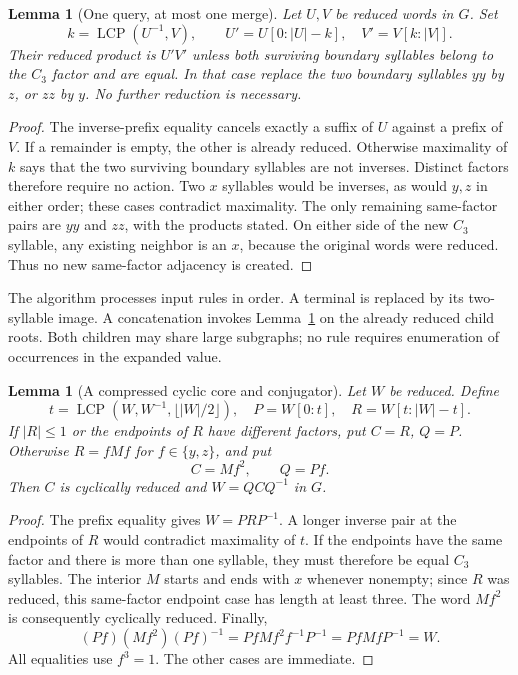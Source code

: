 \documentclass[11pt,letterpaper]{article}
\newtheorem{lemma}[theorem]{Lemma}
\theoremstyle{definition}\newtheorem{definition}[theorem]{Definition}
\theoremstyle{remark}\newtheorem{remark}[theorem]{Remark}
\newcommand{\LCP}{\operatorname{LCP}}
\begin{document}
\begin{lemma}[One query, at most one merge]\label{lem:product}
Let $U,V$ be reduced words in $G$. Set
\[
 k=\LCP(U^{-1},V),\qquad
 U'=U[0:|U|-k],\quad V'=V[k:|V|].
\]
Their reduced product is $U'V'$ unless both surviving boundary syllables belong to the $C_3$ factor and are equal. In that case replace the two boundary syllables $yy$ by $z$, or $zz$ by $y$. No further reduction is necessary.
\end{lemma}
\begin{proof}
The inverse-prefix equality cancels exactly a suffix of $U$ against a prefix of $V$. If a remainder is empty, the other is already reduced. Otherwise maximality of $k$ says that the two surviving boundary syllables are not inverses. Distinct factors therefore require no action. Two $x$ syllables would be inverses, as would $y,z$ in either order; these cases contradict maximality. The only remaining same-factor pairs are $yy$ and $zz$, with the products stated. On either side of the new $C_3$ syllable, any existing neighbor is an $x$, because the original words were reduced. Thus no new same-factor adjacency is created.
\end{proof}

The algorithm processes input rules in order. A terminal is replaced by its two-syllable image. A concatenation invokes Lemma~\ref{lem:product} on the already reduced child roots. Both children may share large subgraphs; no rule requires enumeration of occurrences in the expanded value.

\begin{lemma}[A compressed cyclic core and conjugator]\label{lem:cyclic}
Let $W$ be reduced. Define
\[
 t=\LCP(W,W^{-1},\lfloor |W|/2\rfloor),\quad
 P=W[0:t],\quad R=W[t:|W|-t].
\]
If $|R|\le1$ or the endpoints of $R$ have different factors, put $C=R$, $Q=P$. Otherwise $R=fMf$ for $f\in\{y,z\}$, and put
\[
 C=Mf^2,\qquad Q=Pf.
\]
Then $C$ is cyclically reduced and $W=QCQ^{-1}$ in $G$.
\end{lemma}
\begin{proof}
The prefix equality gives $W=PRP^{-1}$. A longer inverse pair at the endpoints of $R$ would contradict maximality of $t$. If the endpoints have the same factor and there is more than one syllable, they must therefore be equal $C_3$ syllables. The interior $M$ starts and ends with $x$ whenever nonempty; since $R$ was reduced, this same-factor endpoint case has length at least three. The word $Mf^2$ is consequently cyclically reduced. Finally,
\[
 (Pf)(Mf^2)(Pf)^{-1}=P f M f^2 f^{-1}P^{-1}=P f M f P^{-1}=W.
\]
All equalities use $f^3=1$. The other cases are immediate.
\end{proof}
\end{document}
